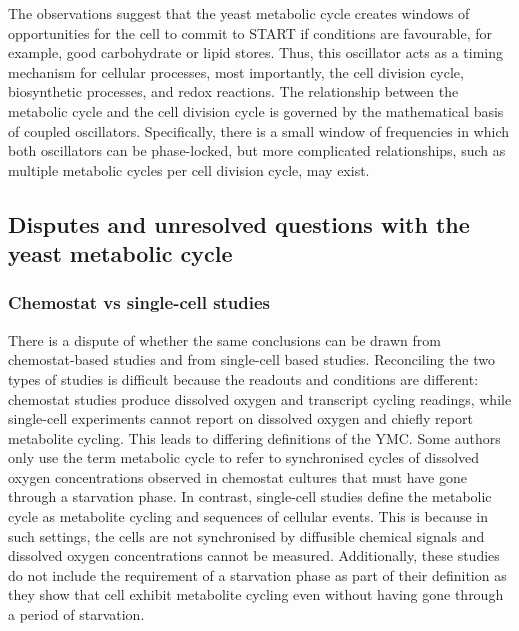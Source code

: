 The observations suggest that the yeast metabolic cycle creates windows of opportunities for the cell to commit to START if conditions are favourable, for example, good carbohydrate or lipid stores.
Thus, this oscillator acts as a timing mechanism for cellular processes, most importantly, the cell division cycle, biosynthetic processes, and redox reactions.
The relationship between the metabolic cycle and the cell division cycle is governed by the mathematical basis of coupled oscillators.
Specifically, there is a small window of frequencies in which both oscillators can be phase-locked, but more complicated relationships, such as multiple metabolic cycles per cell division cycle, may exist.


\subsection[Disputes and unresolved questions]{Disputes and unresolved questions with the yeast metabolic cycle}
\label{subsec:intro-ymc-unresolved}

\subsubsection{Chemostat vs single-cell studies}
\label{subsubsec:intro-ymc-unresolved-chemostat_singlecell}

There is a dispute of whether the same conclusions can be drawn from chemostat-based studies and from single-cell based studies.
Reconciling the two types of studies is difficult because the readouts and conditions are different:
chemostat studies produce dissolved oxygen and transcript cycling readings, while single-cell experiments cannot report on dissolved oxygen and chiefly report metabolite cycling.
This leads to differing definitions of the YMC\@.
Some authors \parencite{laxmanBehaviorMetabolicCycling2010, caustonMetabolicRhythmsFramework2018} only use the term metabolic cycle to refer to synchronised cycles of dissolved oxygen concentrations observed in chemostat cultures that must have gone through a starvation phase.
In contrast, single-cell studies \parencite{baumgartnerFlavinbasedMetabolicCycles2018, zylstraMetabolicDynamicsCell2022} define the metabolic cycle as metabolite cycling and sequences of cellular events.
This is because in such settings, the cells are not synchronised by diffusible chemical signals and dissolved oxygen concentrations cannot be measured.
Additionally, these studies do not include the requirement of a starvation phase as part of their definition as they show that cell exhibit metabolite cycling even without having gone through a period of starvation.

